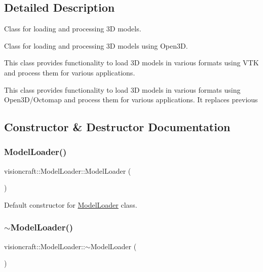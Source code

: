 \subsection{Detailed Description}
Class for loading and processing 3D models. 

Class for loading and processing 3D models using Open3D.

This class provides functionality to load 3D models in various formats using V\+TK and process them for various applications.

This class provides functionality to load 3D models in various formats using Open3\+D/\+Octomap and process them for various applications. It replaces previous 

\subsection{Constructor \& Destructor Documentation}
\mbox{\label{classvisioncraft_1_1ModelLoader_af5ea231cff5edd6199497c414f0bd079}} 
\subsubsection{\texorpdfstring{Model\+Loader()}{ModelLoader()}\hspace{0.1cm}{\footnotesize\ttfamily [1/2]}}
{\footnotesize\ttfamily visioncraft\+::\+Model\+Loader\+::\+Model\+Loader (\begin{DoxyParamCaption}{ }\end{DoxyParamCaption})}



Default constructor for \hyperlink{classvisioncraft_1_1ModelLoader}{Model\+Loader} class. 

\mbox{\label{classvisioncraft_1_1ModelLoader_a64f9d6f1d16b030b7934f8b4bbcd5ef9}} 
\subsubsection{\texorpdfstring{$\sim$\+Model\+Loader()}{~ModelLoader()}\hspace{0.1cm}{\footnotesize\ttfamily [1/2]}}
{\footnotesize\ttfamily visioncraft\+::\+Model\+Loader\+::$\sim$\+Model\+Loader (\begin{DoxyParamCaption}{ }\end{DoxyParamCaption})}



